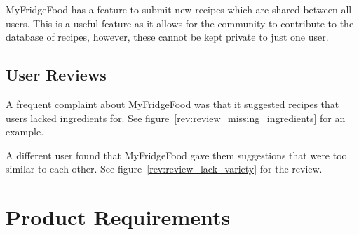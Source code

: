 MyFridgeFood has a feature to submit new recipes which are shared between all users. This is a useful feature as it allows for the community to contribute to the database
of recipes, however, these cannot be kept private to just one user.

\subsection{User Reviews}

A frequent complaint about MyFridgeFood was that it suggested
recipes that users lacked ingredients for. See figure~\ref{rev:review_missing_ingredients} for an example.

A different user found that MyFridgeFood gave them suggestions that were too similar to each
other. See figure~\ref{rev:review_lack_variety} for the review.

\section{Product Requirements}


\newcommand{\requirementtype}{FR}
\newcommand{\requirement}[4]{%
    \requirementtype\stepcounter{functionalreqcounter}\arabic{functionalreqcounter}%
    &\raggedright#1&#2&#3&#4\\}

